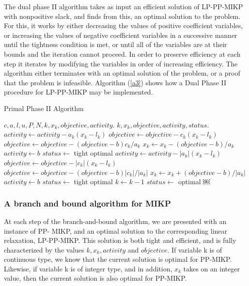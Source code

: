 \documentclass[a4paper,11pt]{article}
\begin{document}
The dual phase II algorithm takes as input an efficient solution of LP-PP-MIKP with nonpositive slack, and finds from this, an optimal solution to the problem. For this, it works by either decreasing the values of positive coefficient variables, or increasing the values of negative coefficient variables in a successive manner until the tightness condition is met, or until all of the variables are at their bounds and the iteration cannot proceed. In order to preserve efficiency at each step it iterates by modifying the variables in order of increasing efficiency. The algorithm either terminates with an optimal solution of the problem, or a proof that the problem is infeasible. Algorithm (\ref{a3}) shows how a Dual Phase II procedure for LP-PP-MIKP may be implemented.

\begin{algorithm}
\caption{Primal Phase II Algorithm}
\label{a3}
\begin{algorithmic}[1] 
\REQUIRE $c,a,l,u, P,N, k, x_k, objective, activity.$
\ENSURE $k, x_k, objective, activity, status.$
			\STATE $activity\leftarrow activity-a_k(x_k-l_k)$
			\STATE $objective\leftarrow objective-c_k(x_k-l_k)$
		\ELSE 
			\STATE $objective\leftarrow objective-(objective-b)c_k/a_k$
			\STATE $x_k\leftarrow x_k - (objective-b)/a_k$
			\STATE $activity\leftarrow b$
			\STATE $status\leftarrow$ tight optimal
			\RETURN
		\ENDIF
	\ELSE
			\STATE $activity\leftarrow activity-|a_k|(x_k-l_k)$
			\STATE $objective\leftarrow objective-|c_k|(x_k-l_k)$
		\ELSE 
			\STATE $objective\leftarrow objective-(objective-b)|c_k|/|a_k|$
			\STATE $x_k\leftarrow x_k + (objective-b)/|a_k|$
			\STATE $activity\leftarrow b$
			\STATE $status\leftarrow$ tight optimal
			\RETURN
		\ENDIF		
	\ENDIF
	\STATE $k\leftarrow k-1$
\ENDWHILE
\STATE $status\leftarrow$ optimal
\RETURN
￼
\end{algorithmic} 
\end{algorithm}


\subsubsection{A branch and bound algorithm for MIKP}

At each step of the branch-and-bound algorithm, we are presented with an instance of PP- MIKP, and an optimal solution to the corresponding linear relaxation, LP-PP-MIKP. This solution is both tight and efficient, and is fully characterized by the values $k,x_k,activity$ and $objective$. If variable k is of continuous type, we know that the current solution is optimal for PP-MIKP. Likewise, if variable k is of integer type, and in addition, $x_k$ takes on an integer value, then the current solution is also optimal for PP-MIKP.
\end{document}
